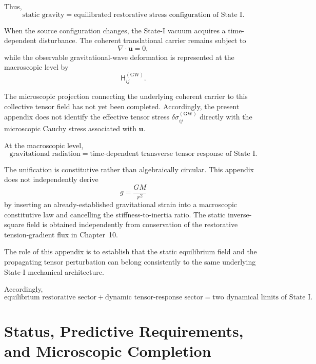 Thus,
\begin{equation}
    \text{static gravity} = \text{equilibrated restorative stress configuration of State I}.
\end{equation}

When the source configuration changes, the State-I vacuum acquires a time-dependent disturbance. The coherent translational carrier remains subject to
\begin{equation}
    \nabla\cdot\mathbf{u} = 0,
\end{equation}
while the observable gravitational-wave deformation is represented at the macroscopic level by
\begin{equation}
    \mathsf{H}_{ij}^{(\mathrm{GW})}.
\end{equation}

The microscopic projection connecting the underlying coherent carrier to this collective tensor field has not yet been completed. Accordingly, the present appendix does not identify the effective tensor stress $\delta\sigma_{ij}^{(\mathrm{GW})}$ directly with the microscopic Cauchy stress associated with $\mathbf{u}$.

At the macroscopic level,
\begin{equation}
    \text{gravitational radiation} = \text{time-dependent transverse tensor response of State I}.
\end{equation}

The unification is constitutive rather than algebraically circular. This appendix does not independently derive
\begin{equation}
    g = \frac{GM}{r^2}
\end{equation}
by inserting an already-established gravitational strain into a macroscopic constitutive law and cancelling the stiffness-to-inertia ratio. The static inverse-square field is obtained independently from conservation of the restorative tension-gradient flux in Chapter~10.

The role of this appendix is to establish that the static equilibrium field and the propagating tensor perturbation can belong consistently to the same underlying State-I mechanical architecture.

Accordingly,
\begin{equation}
    \text{equilibrium restorative sector} + \text{dynamic tensor-response sector} = \text{two dynamical limits of State I}.
\end{equation}

\section{Status, Predictive Requirements, and Microscopic Completion}

